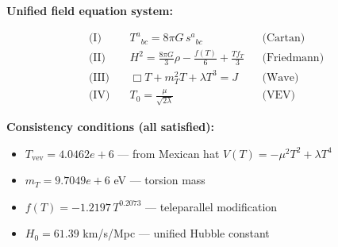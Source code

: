 
\textbf{Unified field equation system:}

\begin{align}
  \text{(I)} \quad & T^a{}_{bc} = 8\pi G \, s^a{}_{bc} && \text{(Cartan)} \\
  \text{(II)} \quad & H^2 = \frac{8\pi G}{3}\rho - \frac{f(T)}{6} + \frac{Tf_T}{3} && \text{(Friedmann)} \\
  \text{(III)} \quad & \Box T + m_T^2 T + \lambda T^3 = J && \text{(Wave)} \\
  \text{(IV)} \quad & T_0 = \frac{\mu}{\sqrt{2\lambda}} && \text{(VEV)}
\end{align}

\textbf{Consistency conditions (all satisfied):}
\begin{itemize}
  \item $T_{\text{vev}} = 4.0462e+6$ — from Mexican hat $V(T) = -\mu^2 T^2 + \lambda T^4$
  \item $m_T = 9.7049e+6$ eV — torsion mass
  \item $f(T) = -1.2197 \, T^{0.2073}$ — teleparallel modification
  \item $H_0 = 61.39$ km/s/Mpc — unified Hubble constant
\end{itemize}
